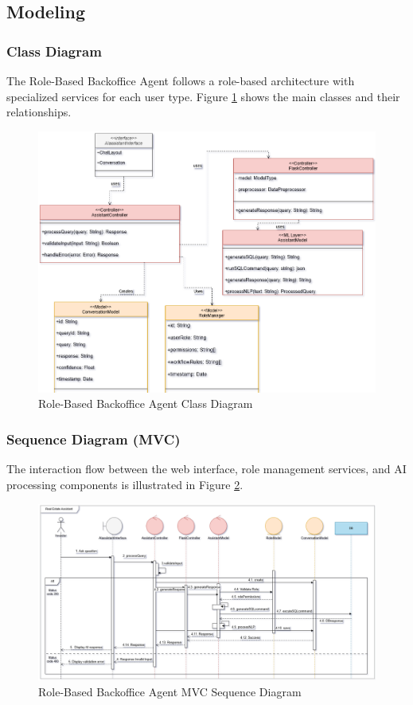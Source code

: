 \subsection{Modeling}
\subsubsection{Class Diagram}
The Role-Based Backoffice Agent follows a role-based architecture with specialized services for each user type. Figure \ref{fig:backoffice-class-diagram} shows the main classes and their relationships.
\begin{figure}[htbp]
    \centering
    \includegraphics[width=1\textwidth]{images/backoffice_class_diagram.png}
    \caption{Role-Based Backoffice Agent Class Diagram}
    \label{fig:backoffice-class-diagram}
\end{figure}

\subsubsection{Sequence Diagram (MVC)}
The interaction flow between the web interface, role management services, and AI processing components is illustrated in Figure \ref{fig:backoffice-sequence-mvc}.
\newpage
\begin{figure}[htbp]
    \centering
    \includegraphics[width=1.1\textwidth]{images/backoffice_sequence_mvc.png}
    \caption{Role-Based Backoffice Agent MVC Sequence Diagram}
    \label{fig:backoffice-sequence-mvc}
\end{figure}

